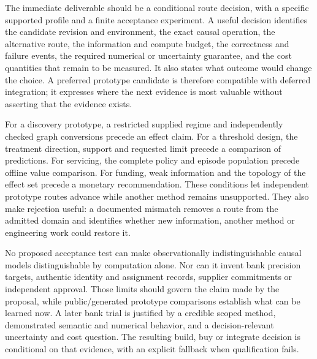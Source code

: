 The immediate deliverable should be a conditional route decision, with a
specific supported profile and a finite acceptance experiment. A useful
decision identifies the candidate revision and environment, the exact causal
operation, the alternative route, the information and compute budget, the
correctness and failure events, the required numerical or uncertainty
guarantee, and the cost quantities that remain to be measured. It also states
what outcome would change the choice. A preferred prototype candidate is
therefore compatible with deferred integration; it expresses where the next
evidence is most valuable without asserting that the evidence exists.
\citep{exec16_s10_design}

For a discovery prototype, a restricted supplied regime and independently
checked graph conversions precede an effect claim. For a threshold design,
the treatment direction, support and requested limit precede a comparison of
predictions. For servicing, the complete policy and episode population precede
offline value comparison. For funding, weak information and the topology of
the effect set precede a monetary recommendation. These conditions let
independent prototype routes advance while another method remains unsupported.
They also make rejection useful: a documented mismatch removes a route from
the admitted domain and identifies whether new information, another method or
engineering work could restore it.

No proposed acceptance test can make observationally indistinguishable causal
models distinguishable by computation alone. Nor can it invent bank precision
targets, authentic identity and assignment records, supplier commitments or
independent approval. Those limits should govern the claim made by the
proposal, while public/generated prototype comparisons establish what can be
learned now. A later bank trial is justified by a credible scoped method,
demonstrated semantic and numerical behavior, and a decision-relevant
uncertainty and cost question. The resulting build, buy or integrate decision
is conditional on that evidence, with an explicit fallback when qualification
fails.
\label{exec16:s10-end}
